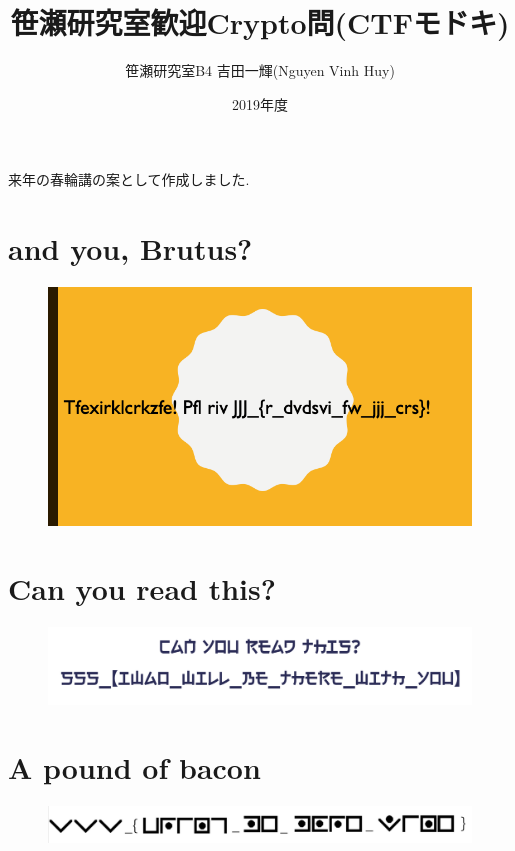 \documentclass{jsarticle}
\title{笹瀬研究室歓迎Crypto問(CTFモドキ)}
\author{笹瀬研究室B4 吉田一輝(Nguyen Vinh Huy)}
\date{2019年度}
\begin{document}
\maketitle

来年の春輪講の案として作成しました. 

\section{and you, Brutus?}
\begin{figure}[H]
	\begin{center}
		\includegraphics[clip, width=15.9cm]{./Challenge1.png}
	\end{center}
\end{figure}

\section{Can you read this?}
\begin{figure}[H]
	\begin{center}
		\includegraphics[clip, width=15.9cm]{./Challenge2.png}
	\end{center}
\end{figure}

\section{A pound of bacon}
\begin{figure}[H]
	\begin{center}
		\includegraphics[clip, width=15.9cm]{./Challenge3.png}
	\end{center}
\end{figure}
\end{document}
